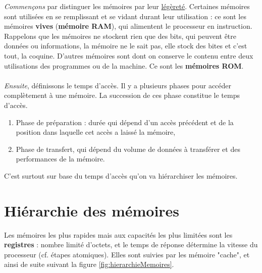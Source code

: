 \documentclass[12pt,a4paper]{report}
\begin{document}
\textit{Commençons} par distinguer les mémoires par leur \underline{légèreté}. Certaines mémoires sont utilisées en se remplissant et se vidant durant leur utilisation : ce sont les mémoires \textbf{vives} (\textbf{mémoire RAM}), qui alimentent le processeur en instruction. Rappelons que les mémoires ne stockent rien que des bits, qui peuvent être données ou informations, la mémoire ne le sait pas, elle stock des bites et c'est tout, la coquine. D'autres mémoires sont  dont on conserve le contenu entre deux utilisations des programmes ou de la machine. Ce sont les \textbf{mémoires ROM}.  \\ \\ 
\textit{Ensuite}, définissons le temps d'accès. Il y a plusieurs phases pour accéder complètement à une mémoire. La succession de ces phase constitue le temps d'accès.
\begin{enumerate}[label = \roman*.]
\item Phase de préparation : durée qui dépend d'un accès précédent et de la position dans laquelle cet accès a laissé la mémoire,
\item Phase de transfert, qui dépend du volume de données à transférer et des performances de la mémoire.
\end{enumerate}
C'est surtout sur base du temps d'accès qu'on va hiérarchiser les mémoires.

\section{Hiérarchie des mémoires}
Les mémoires les plus rapides mais aux capacités les plus limitées sont les \textbf{registres} : nombre limité d'octets, et le temps de réponse détermine la vitesse du processeur (cf. étapes atomiques). Elles sont suivies par les mémoire "cache", et ainsi de suite suivant la figure \ref{fig:hierarchieMemoires}.
\end{document}
